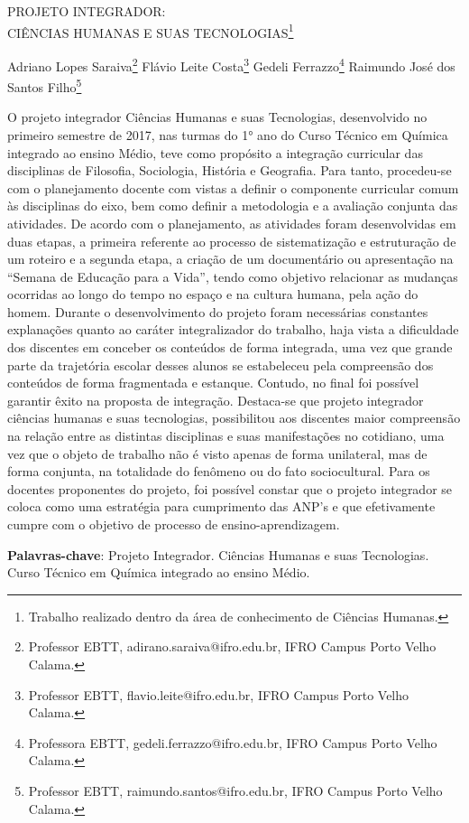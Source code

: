 \documentclass[article,12pt,onesidea,4paper,english,brazil]{abntex2}
\begin{document}
	
	
	\frenchspacing 
	
	\begin{center}
		\LARGE PROJETO INTEGRADOR:\\ CIÊNCIAS HUMANAS E SUAS TECNOLOGIAS\footnote{Trabalho realizado dentro da área de conhecimento de Ciências Humanas.}
		
		\normalsize
	Adriano Lopes Saraiva\footnote{Professor EBTT, adirano.saraiva@ifro.edu.br, IFRO Campus Porto Velho Calama.} 
	Flávio Leite Costa\footnote{Professor EBTT, flavio.leite@ifro.edu.br, IFRO Campus Porto Velho Calama.} 
	Gedeli Ferrazzo\footnote{Professora EBTT, gedeli.ferrazzo@ifro.edu.br, IFRO Campus Porto Velho Calama.} 
	Raimundo José dos Santos Filho\footnote{Professor EBTT, raimundo.santos@ifro.edu.br, IFRO Campus Porto Velho Calama.} 
	\end{center}
	
	\noindent O projeto integrador Ciências Humanas e suas Tecnologias, desenvolvido no
	primeiro semestre de 2017, nas turmas do 1° ano do Curso Técnico em Química
	integrado ao ensino Médio, teve como propósito a integração curricular das
	disciplinas de Filosofia, Sociologia, História e Geografia. Para tanto, procedeu-se
	com o planejamento docente com vistas a definir o componente curricular comum às
	disciplinas do eixo, bem como definir a metodologia e a avaliação conjunta das
	atividades. De acordo com o planejamento, as atividades foram desenvolvidas em
	duas etapas, a primeira referente ao processo de sistematização e estruturação de
	um roteiro e a segunda etapa, a criação de um documentário ou apresentação na
	“Semana de Educação para a Vida”, tendo como objetivo relacionar as mudanças
	ocorridas ao longo do tempo no espaço e na cultura humana, pela ação do homem.
	Durante o desenvolvimento do projeto foram necessárias constantes explanações
	quanto ao caráter integralizador do trabalho, haja vista a dificuldade dos discentes
	em conceber os conteúdos de forma integrada, uma vez que grande parte da
	trajetória escolar desses alunos se estabeleceu pela compreensão dos conteúdos de
	forma fragmentada e estanque. Contudo, no final foi possível garantir êxito na
	proposta de integração. Destaca-se que projeto integrador ciências humanas e suas
	tecnologias, possibilitou aos discentes maior compreensão na relação entre as
	distintas disciplinas e suas manifestações no cotidiano, uma vez que o objeto de
	trabalho não é visto apenas de forma unilateral, mas de forma conjunta, na
	totalidade do fenômeno ou do fato sociocultural. Para os docentes proponentes do
	projeto, foi possível constar que o projeto integrador se coloca como uma estratégia
	para cumprimento das ANP’s e que efetivamente cumpre com o objetivo de
	processo de ensino-aprendizagem.
	
	\vspace{\onelineskip}
	
	\noindent
	\textbf{Palavras-chave}: Projeto Integrador. Ciências Humanas e suas Tecnologias. Curso Técnico em Química integrado ao ensino Médio.
	
\end{document}
